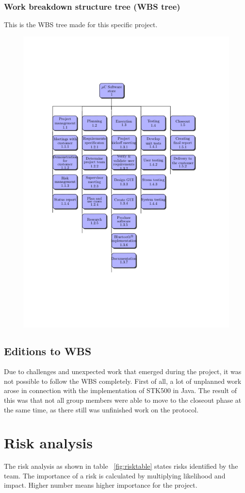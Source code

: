 \subsubsection{Work breakdown structure tree (WBS tree)}
This is the WBS tree made for this specific project.
\begin{figure}[H]
\vspace*{-1.5in}
\hspace*{-1.2in}
\includegraphics[trim=0cm 4cm 0cm 0cm]{figures/wbs-tree2.pdf}
\end{figure}

\subsection{Editions to WBS}
Due to challenges and unexpected work that emerged during the project, it was not possible to follow the WBS completely. First of all, a lot of unplanned work arose in connection with the implementation of STK500 in Java. The result of this was that not all group members were able to move to the closeout phase at the same time, as there still was unfinished work on the protocol.

\section{Risk analysis}
The risk analysis as shown in table ~\ref{fig:risktable} states risks identified by the team. The importance of a risk is calculated by multiplying likelihood and impact. Higher number means higher importance for the project.

